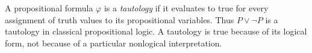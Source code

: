 
A propositional formula $\varphi$ is a \emph{tautology} if it evaluates to true for every assignment of truth values to its propositional variables. Thus $P\lor\neg P$ is a tautology in classical propositional logic. A tautology is true because of its logical form, not because of a particular nonlogical interpretation.
